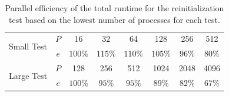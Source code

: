 \begin{table}
\centering
	\begin{tabular}{|l|c|cccccc|}
	\hline
	\multirow{2}{*}{Small Test} & $P$ & 16      & 32      & 64      & 128     & 256    & 512 \\ 	                            
	                            & $e$ & $100\%$ & $115\%$ & $110\%$ & $105\%$ & $96\%$ & $80\%$ \\
	\hline
	\multirow{2}{*}{Large Test} & $P$ & 128     & 256     & 512     & 1024    & 2048   & 4096 \\ 	                            
	                            & $e$ & $100\%$ & $95\%$ & $95\%$ & $89\%$ & $82\%$ & $67\%$ \\
	\hline
	\end{tabular}
	\caption{Parallel efficiency of the total runtime for the reinitialization test based on the lowest number of processes for each test.}
	\label{tab:scaling_reinit}
\end{table}
